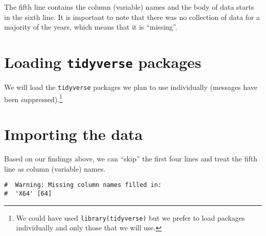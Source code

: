 \documentclass[a4paper,9pt,twocolumn,twoside,printwatermark=false]{pinp}
\begin{document}
The fifth line contains the column (variable) names and the body of data
starts in the sixth line. It is important to note that there was no
collection of data for a majority of the years, which means that it is
``missing''.

\section{\texorpdfstring{Loading \texttt{tidyverse}
packages}{Loading tidyverse packages}}\label{loading-tidyverse-packages}

We will load the \texttt{tidyverse} packages we plan to use individually
(messages have been suppressed).\footnote{We could have used
  \texttt{library(tidyverse)} but we prefer to load packages
  individually and only those that we will use.}

\begin{Shaded}
\begin{Highlighting}[]
\end{Highlighting}
\end{Shaded}

\section{Importing the data}\label{importing-the-data}

Based on our findings above, we can ``skip'' the first four lines and
treat the fifth line as column (variable) names.

\begin{Shaded}
\begin{Highlighting}[]
\StringTok{ }\NormalTok{(}\NormalTok{(}\NormalTok{, }\NormalTok{), }
              \NormalTok{)}
\end{Highlighting}
\end{Shaded}

\begin{ShadedResult}
\begin{verbatim}
#  Warning: Missing column names filled in:
#  'X64' [64]
\end{verbatim}
\end{ShadedResult}
\end{document}
